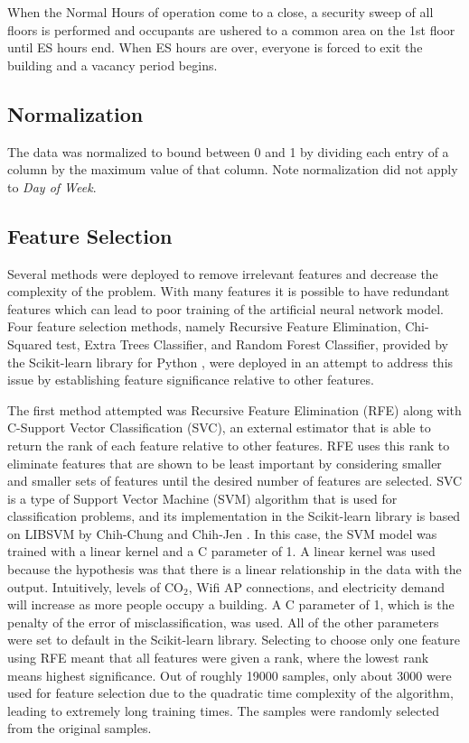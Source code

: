\documentclass[letterpaper, 12 pt, conference]{ieeeconf}  %
\begin{document}
When the Normal Hours of operation come to a close, a security sweep of all floors is performed and occupants are ushered to a common area on the 1st floor until ES hours end. When ES hours are over, everyone is forced to exit the building and a vacancy period begins.

\subsection{Normalization}

The data was normalized to bound between 0 and 1 by dividing each entry of a column by the maximum value of that column. Note normalization did not apply to \textit{Day of Week}.

\subsection{Feature Selection}

Several methods were deployed to remove irrelevant features and decrease the complexity of the problem. With many features it is possible to have redundant features which can lead to poor training of the artificial neural network model. Four feature selection methods, namely Recursive Feature Elimination, Chi-Squared test, Extra Trees Classifier, and  Random Forest Classifier, provided by the Scikit-learn library for Python \cite{Pedregosa}, were deployed in an attempt to address this issue by establishing feature significance relative to other features.

The first method attempted was Recursive Feature Elimination (RFE) along with C-Support Vector Classification (SVC), an external estimator that is able to return the rank of each feature relative to other features. RFE uses this rank to eliminate features that are shown to be least important by considering smaller and smaller sets of features until the desired number of features are selected. SVC is a type of Support Vector Machine (SVM) algorithm that is used for classification problems, and its implementation in the Scikit-learn library is based on LIBSVM by Chih-Chung and Chih-Jen \cite{LIBSVM}. In this case, the SVM model was trained with a linear kernel and a C parameter of 1. A linear kernel was used because the hypothesis was that there is a linear relationship in the data with the output. Intuitively, levels of CO$_2$, Wifi AP connections, and electricity demand will increase as more people occupy a building. A C parameter of 1, which is the penalty of the error of misclassification, was used.  All of the other parameters were set to default in the Scikit-learn library. Selecting to choose only one feature using RFE meant that all features were given a rank, where the lowest rank means highest significance. Out of roughly 19000 samples, only about 3000 were used for feature selection due to the quadratic time complexity of the algorithm, leading to extremely long training times. The samples were randomly selected from the original samples.
        
\end{document}
